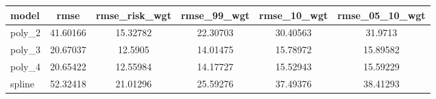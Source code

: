 \documentclass[]{article}
\begin{document}
\begin{tabular}{lccccc} \hline
model & rmse & rmse\_risk\_wgt & rmse\_99\_wgt & rmse\_10\_wgt & rmse\_05\_10\_wgt \\ \hline
poly\_2 & 41.60166 & 15.32782 & 22.30703 & 30.40563 & 31.9713 \\
poly\_3 & 20.67037 & 12.5905 & 14.01475 & 15.78972 & 15.89582 \\
poly\_4 & 20.65422 & 12.55984 & 14.17727 & 15.52943 & 15.59229 \\
 spline & 52.32418 & 21.01296 & 25.59276 & 37.49376 & 38.41293 \\ \hline
\end{tabular}
\end{document}
